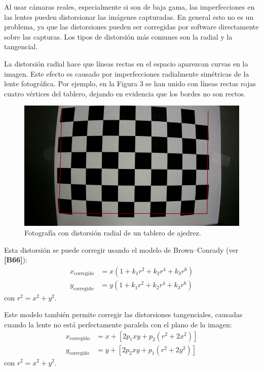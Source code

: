 \documentclass[11pt,a4paper,titlepage]{article}
\newcommand{\Cite}[1]{\textbf{[#1]}}
\newcommand{\Figure}[1]{Figura #1}
\begin{document}
Al usar cámaras reales, especialmente si son de baja gama, las imperfecciones en las lentes pueden distorsionar las imágenes capturadas. En general esto no es un problema, ya que las distorsiones pueden ser corregidas por software directamente sobre las capturas. Los tipos de distorsión más comunes son la radial y la tangencial.

La distorsión radial hace que líneas rectas en el espacio aparezcan curvas en la imagen. Este efecto es causado por imperfecciones radialmente simétricas de la lente fotográfica. Por ejemplo, en la \Figure{3} se han unido con líneas rectas rojas cuatro vértices del tablero, dejando en evidencia que los bordes no son rectos.


\begin{figure}[h!]

  \centering
    \includegraphics[width=1\textwidth]{f3.png}
  \caption{Fotografía con distorsión radial de un tablero de ajedrez.}
\end{figure}

Esta distorsión se puede corregir usando el modelo de Brown–Conrady (ver \Cite{B66}):
\begin{align*}
	x_\mathrm{corregido} &= x \left( 1 + k_1 r^2 + k_2 r^4 + k_3 r^6 \right) \\
	y_\mathrm{corregido} &= y \left( 1 + k_1 r^2 + k_2 r^4 + k_3 r^6 \right)
\end{align*}
con $r^2 = x^2 + y^2$.

Este modelo también permite corregir las distorsiones tangenciales, causadas cuando la lente no está perfectamente paralela con el plano de la imagen:
\begin{align*}
	x_\mathrm{corregido} &= x + \left[ 2 p_1 x y + p_2 \left( r^2 + 2x^2 \right) \right] \\
	y_\mathrm{corregido} &= y + \left[ 2 p_2 x y + p_1 \left( r^2 + 2y^2 \right) \right]
\end{align*}
con $r^2 = x^2 + y^2$.
\end{document}
